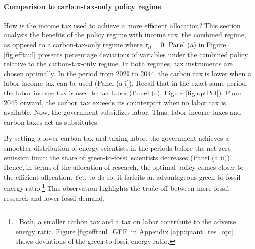\begin{figure}[h!!!]
\begin{subfigure}[]{1\textwidth}
\begin{subfigure}[]{0.4\textwidth}
	\end{subfigure}	
\end{subfigure}
\end{figure} 


\paragraph{Comparison to carbon-tax-only policy regime}
How is the income tax used to achieve a more efficient allocation?
This section analysis the benefits of the policy regime with income tax, the {combined} regime, as opposed to a {carbon-tax-only} regime where $\tau_{\iota t}=0$.  
Panel (a)  in Figure \ref{fig:efftaul} presents percentage deviations of variables under the combined policy relative to the carbon-tax-only regime. In both regimes, tax instruments are chosen optimally. In the period from 2020 to 2044, the carbon tax is lower when a labor income tax can be used (Panel (a i)). Recall that in the exact same period, the labor income tax is used to tax labor (Panel (a), Figure \ref{fig:optPol}). From 2045 onward, the carbon tax exceeds its counterpart when no labor tax is available. Now, the government subsidizes labor. Thus, labor income taxes and carbon taxes act as substitutes.

By setting a lower carbon tax and taxing labor, the government achieves a smoother distribution of energy scientists in the periods before the net-zero emission limit: the share of green-to-fossil scientists decreases (Panel (a ii)). 
Hence, in terms of the allocation of research, the optimal policy comes closer to the efficient allocation. Yet, to do so, it forfeits an advantageous green-to-fossil energy ratio.\footnote{ \ Both, a smaller carbon tax and a tax on labor contribute to the adverse energy ratio. Figure \ref{fig:efftaul_GFF} in Appendix \ref{app:quant_res_opt} shows deviations of the green-to-fossil energy ratio.} This observation highlights the trade-off between more fossil research and lower fossil demand. 

